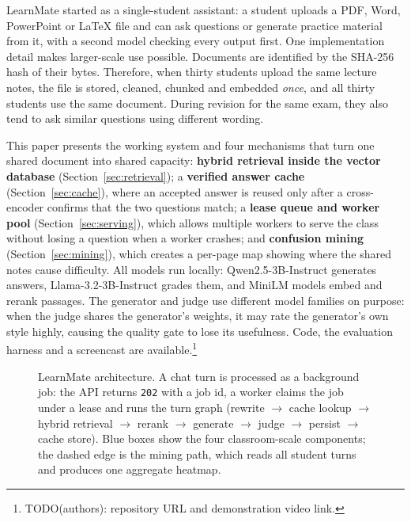\documentclass[conference]{IEEEtran}
\newcommand{\sys}{LearnMate}
\begin{document}
\sys{} started as a single-student assistant: a student uploads a PDF, Word, PowerPoint or \LaTeX{}
file and can ask questions or generate practice material from it, with a second model checking every
output first. One implementation detail makes larger-scale use possible. Documents are identified
by the SHA-256 hash of their bytes. Therefore, when thirty students upload the same lecture notes,
the file is stored, cleaned, chunked and embedded \emph{once}, and all thirty students use the same
document. During revision for the same exam, they also tend to ask similar questions using different
wording.

This paper presents the working system and four mechanisms that turn one shared document into
shared capacity: \textbf{hybrid retrieval inside the vector database}
(Section~\ref{sec:retrieval}); a \textbf{verified answer cache} (Section~\ref{sec:cache}), where
an accepted answer is reused only after a cross-encoder confirms that the two questions match; a
\textbf{lease queue and worker pool} (Section~\ref{sec:serving}), which allows multiple workers to
serve the class without losing a question when a worker crashes; and \textbf{confusion mining}
(Section~\ref{sec:mining}), which creates a per-page map showing where the shared notes cause
difficulty. All models run locally: Qwen2.5-3B-Instruct \cite{qwen2025qwen25} generates answers,
Llama-3.2-3B-Instruct \cite{grattafiori2024llama3} grades them, and MiniLM models embed and rerank
passages. The generator and judge use different model families on purpose: when the judge shares the
generator's weights, it may rate the generator's own style highly, causing the quality gate to lose
its usefulness. Code, the evaluation harness and a screencast are available.\footnote{TODO(authors): repository URL
and demonstration video link.}

\begin{figure}[t]
\centering

\caption{\sys{} architecture. A chat turn is processed as a background job: the API returns \texttt{202} with
a job id, a worker claims the job under a lease and runs the turn graph (rewrite $\rightarrow$
cache lookup $\rightarrow$ hybrid retrieval $\rightarrow$ rerank $\rightarrow$ generate
$\rightarrow$ judge $\rightarrow$ persist $\rightarrow$ cache store). Blue boxes show the four
classroom-scale components; the dashed edge is the mining path, which reads all student
turns and produces one aggregate heatmap.}
\label{fig:arch}
\end{figure}
\end{document}
